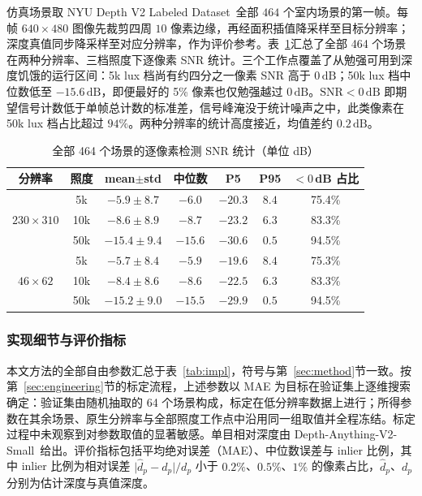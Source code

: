 仿真场景取 NYU Depth V2 Labeled Dataset~\cite{Silberman2012}全部 $464$ 个室内场景的第一帧。每帧 $640\times480$ 图像先裁剪四周 $10$ 像素边缘，再经面积插值降采样至目标分辨率；深度真值同步降采样至对应分辨率，作为评价参考。表~\ref{tab:snr}汇总了全部 464 个场景在两种分辨率、三档照度下逐像素 SNR 统计。三个工作点覆盖了从勉强可用到深度饥饿的运行区间：5k lux 档尚有约四分之一像素 SNR 高于 $0\,\mathrm{dB}$；50k lux 档中位数低至 $-15.6\,\mathrm{dB}$，即便最好的 5\% 像素也仅勉强越过 $0\,\mathrm{dB}$。$\mathrm{SNR}<0\,\mathrm{dB}$ 即期望信号计数低于单帧总计数的标准差，信号峰淹没于统计噪声之中，此类像素在 50k lux 档占比超过 $94\%$。两种分辨率的统计高度接近，均值差约 $0.2\,\mathrm{dB}$。

\begin{table}[!t]
\centering
\caption{全部 464 个场景的逐像素检测 SNR 统计（单位 dB）}
\label{tab:snr}\small\setlength{\tabcolsep}{2pt}
\begin{tabular}{ccccccc}
\toprule
分辨率 & 照度 & mean$\pm$std & 中位数 & P5 & P95 & $<0$\,dB 占比 \\
\midrule
\multirow{3}{*}{$230\times310$} & 5k & $-5.9\pm8.7$ & $-6.0$ & $-20.3$ & $8.4$ & 75.4\% \\
 & 10k & $-8.6\pm8.9$ & $-8.7$ & $-23.2$ & $6.3$ & 83.3\% \\
 & 50k & $-15.4\pm9.4$ & $-15.6$ & $-30.6$ & $0.5$ & 94.5\% \\
\midrule
\multirow{3}{*}{$46\times62$} & 5k & $-5.7\pm8.4$ & $-5.9$ & $-19.6$ & $8.4$ & 75.3\% \\
 & 10k & $-8.4\pm8.6$ & $-8.6$ & $-22.5$ & $6.3$ & 83.3\% \\
 & 50k & $-15.2\pm9.0$ & $-15.5$ & $-29.9$ & $0.5$ & 94.5\% \\
\bottomrule
\end{tabular}
\end{table}

\subsubsection{实现细节与评价指标}
本文方法的全部自由参数汇总于表~\ref{tab:impl}，符号与第~\ref{sec:method}节一致。按第~\ref{sec:engineering}节的标定流程，上述参数以 MAE 为目标在验证集上逐维搜索确定：验证集由随机抽取的 64 个场景构成，标定在低分辨率数据上进行；所得参数在其余场景、原生分辨率与全部照度工作点中沿用同一组取值并全程冻结。标定过程中未观察到对参数取值的显著敏感。单目相对深度由 Depth-Anything-V2-Small~\cite{Yang2024}给出。评价指标包括平均绝对误差（MAE）、中位数误差与 inlier 比例，其中 inlier 比例为相对误差 $\lvert\hat d_p-d_p\rvert/d_p$ 小于 $0.2\%$、$0.5\%$、$1\%$ 的像素占比，$\hat d_p$、$d_p$ 分别为估计深度与真值深度。

